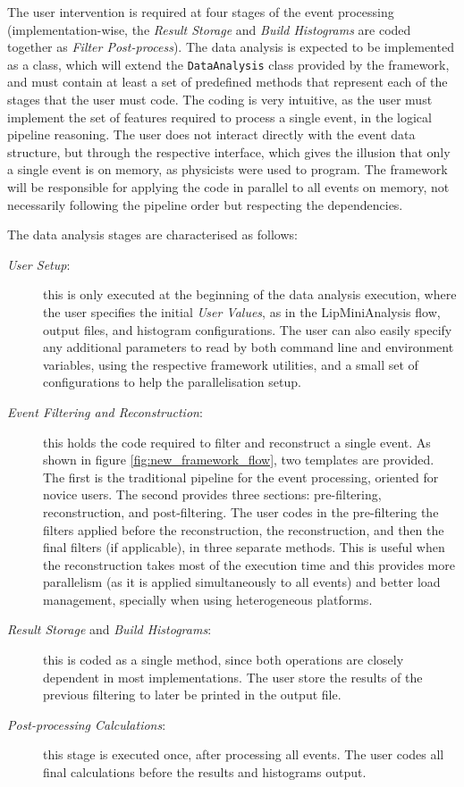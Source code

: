 The user intervention is required at four stages of the event processing (implementation-wise, the \textit{Result Storage} and \textit{Build Histograms} are coded together as \textit{Filter Post-process}). The data analysis is expected to be implemented as a class, which will extend the \texttt{DataAnalysis} class provided by the framework, and must contain at least a set of predefined methods that represent each of the stages that the user must code. The coding is very intuitive, as the user must implement the set of features required to process a single event, in the logical pipeline reasoning. The user does not interact directly with the event data structure, but through the respective interface, which gives the illusion that only a single event is on memory, as physicists were used to program. The framework will be responsible for applying the code in parallel to all events on memory, not necessarily following the pipeline order but respecting the dependencies.

The data analysis stages are characterised as follows:

\begin{description}
	\item[\textit{User Setup}:] this is only executed at the beginning of the data analysis execution, where the user specifies the initial \textit{User Values}, as in the LipMiniAnalysis flow, output files, and histogram configurations. The user can also easily specify any additional parameters to read by both command line and environment variables, using the respective framework utilities, and a small set of configurations to help the parallelisation setup.
	\item[\textit{Event Filtering and Reconstruction}:] this holds the code required to filter and reconstruct a single event. As shown in figure \ref{fig:new_framework_flow}, two templates are provided. The first is the traditional pipeline for the event processing, oriented for novice users. The second provides three sections: pre-filtering, reconstruction, and post-filtering. The user codes in the pre-filtering the filters applied before the reconstruction, the reconstruction, and then the final filters (if applicable), in three separate methods. This is useful when the reconstruction takes most of the execution time and this provides more parallelism (as it is applied simultaneously to all events) and better load management, specially when using heterogeneous platforms.
	\item[\textit{Result Storage} and \textit{Build Histograms}:] this is coded as a single method, since both operations are closely dependent in most implementations. The user store the results of the previous filtering to later be printed in the output file.
	\item[\textit{Post-processing Calculations}:] this stage is executed once, after processing all events. The user codes all final calculations before the results and histograms output.
\end{description}

